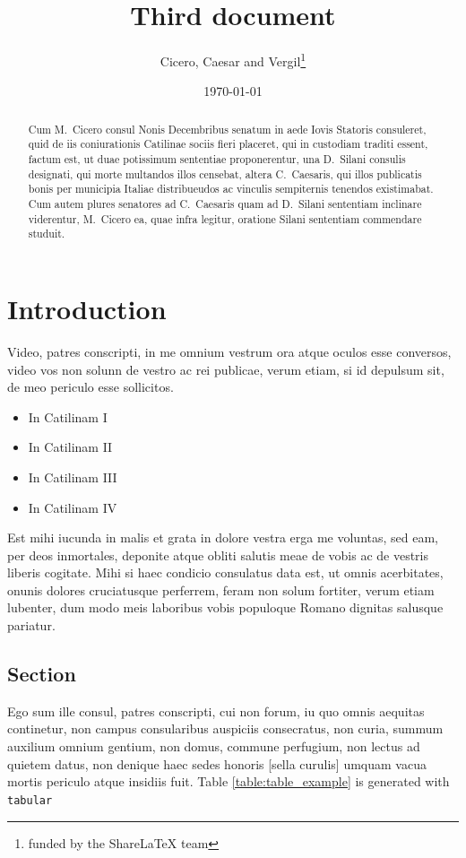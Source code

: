 \documentclass[12pt, a4paper, twoside, english]{report}
\title{Third document}
\author{Cicero, Caesar and Vergil\thanks{funded by the ShareLaTeX team}}
\date{\today}
\begin{document}
	
	\maketitle
	
	\begin{abstract}
		Cum M.~Cicero consul Nonis Decembribus senatum in aede
		Iovis Statoris consuleret, quid de iis coniurationis Catilinae
		sociis fieri placeret, qui in custodiam traditi essent, factum
		est, ut duae potissimum sententiae proponerentur, una D.~Silani consulis
		designati, qui morte multandos illos censebat,
		altera C.~Caesaris, qui illos publicatis bonis per municipia
		Italiae distribueudos ac vinculis sempiternis tenendos existimabat. Cum
		autem plures senatores ad C.~Caesaris quam ad
		D.~Silani sententiam inclinare viderentur, M.~Cicero ea, quae
		infra legitur, oratione Silani sententiam commendare studuit.
		\vfill
	\end{abstract}


	\chapter{Introduction}
	
	Video, patres conscripti, in me omnium vestrum ora atque oculos esse
	conversos, video vos non solunn de vestro ac rei publicae, verum etiam,
	si id depulsum sit, de meo periculo esse sollicitos. 
	\begin{itemize}
		\item In Catilinam I
		\item In Catilinam II
		\item In Catilinam III
		\item In Catilinam IV
	\end{itemize}
	Est mihi iucunda in
	malis et grata in dolore vestra erga me voluntas, sed eam, per deos
	inmortales, deponite atque obliti salutis meae de vobis ac de vestris
	liberis cogitate. Mihi si haec condicio consulatus data est, ut omnis
	acerbitates, onunis dolores cruciatusque perferrem, feram non solum
	fortiter, verum etiam lubenter, dum modo meis laboribus vobis populoque
	Romano dignitas salusque pariatur.
	
	
	\section{Section}
	
	Ego sum ille consul, patres
	conscripti, cui non forum, iu quo omnis aequitas continetur, non campus
	consularibus auspiciis consecratus, non curia, summum auxilium  omnium
	gentium, non domus, commune perfugium, non lectus ad quietem datus, non
	denique haec sedes honoris [sella curulis] umquam vacua mortis periculo
	atque insidiis fuit. 
	Table \ref{table:table_example} is generated with \texttt{tabular}
	
\end{document}
